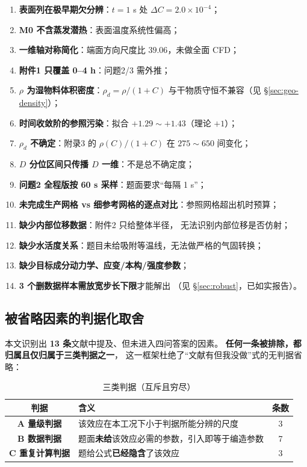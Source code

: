 \begin{enumerate}[leftmargin=2.2em, itemsep=2pt]
  \item \textbf{表面列在极早期欠分辨}：$t=1$ s 处 $\Delta C=2.0\times10^{-4}$；
  \item \textbf{M0 不含蒸发潜热}：表面温度系统性偏高；
  \item \textbf{一维轴对称简化}：端面方向尺度比 $39.06$，未做全面 CFD；
  \item \textbf{附件1 只覆盖 0--4 h}：问题2/3 需外推；
  \item \textbf{$\rho$ 为湿物料体积密度}：$\rho_d=\rho/(1+C)$
        与干物质守恒不兼容（见 \S\ref{sec:geo-density}）；
  \item \textbf{时间收敛阶的参照污染}：拟合 $+1.29\sim+1.43$（理论 $+1$）；
  \item \textbf{$\rho_d$ 不确定}：附录3 的 $\rho(C)/(1+C)$ 在 $275\sim650$ 间变化；
  \item \textbf{$D$ 分位区间只传播 $D$ 一维}：不是总不确定度；
  \item \textbf{问题2 全程版按 60 s 采样}：题面要求``每隔 1 s''；
  \item \textbf{未完成生产网格 vs 细参考网格的逐点对比}：参照网格超出机时预算；
  \item \textbf{缺少内部位移数据}：附件2 只给整体半径，
        无法识别内部位移是否仿射；
  \item \textbf{缺少水活度关系}：题目未给吸附等温线，无法做严格的气固转换；
  \item \textbf{缺少目标成分动力学、应变/本构/强度参数}；
  \item \textbf{3 个删数据样本需放宽步长下限}才能解出
        （见 \S\ref{sec:robust}，已如实报告）。
\end{enumerate}

\subsection{被省略因素的判据化取舍}
\label{sec:omitted}

本文识别出 \textbf{13 条}文献中提及、但未进入四问答案的因素。
\textbf{任何一条被排除，都归属且仅归属于三类判据之一}，
这一框架杜绝了``文献有但我没做''式的无判据省略：

\begin{table}[H]
  \centering
  \caption{三类判据（互斥且穷尽）}
  \label{tab:criteria}
  \footnotesize
  \begin{tabular}{@{}clc@{}}
    \toprule
    判据 & 含义 & 条数 \\
    \midrule
    \textbf{A 量级判据} & 该效应在本工况下小于判据所能分辨的尺度 & 3 \\
    \textbf{B 数据判据} & 题面\textbf{未给}该效应必需的参数，引入即等于编造参数 & 7 \\
    \textbf{C 重复计算判据} & 题给公式\textbf{已经隐含}了该效应 & 3 \\
    \bottomrule
  \end{tabular}
\end{table}

